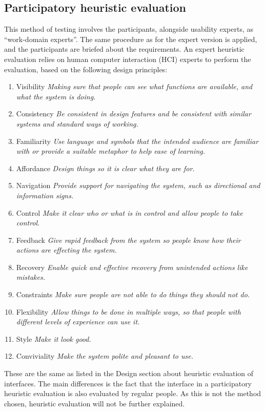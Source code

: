 \subsection{Participatory heuristic evaluation}
This method of testing involves the participants, alongside usability experts, as ``work-domain experts''. The same procedure as for the expert version is applied, and the participants are briefed about the requirements. An expert heuristic evaluation relies on human computer interaction (HCI) experts to perform the evaluation, based on the following design principles:
\begin{enumerate}
	\item Visibility \textit{Making sure that people can see what functions are available, and what the system is doing.}
	\item Consistency \textit{Be consistent in design features and be consistent with similar systems and standard ways of working.}
	\item Familiarity \textit{Use language and symbols that the intended audience are familiar with or provide a suitable metaphor to help ease of learning.}
	\item Affordance \textit{Design things so it is clear what they are for.}
	\item Navigation \textit{Provide support for navigating the system, such as directional and information signs.}
	\item Control \textit{Make it clear who or what is in control and allow people to take control.}
	\item Feedback \textit{Give rapid feedback from the system so people know how their actions are effecting the system.}
	\item Recovery \textit{Enable quick and effective recovery from unintended actions like mistakes.}
	\item Constraints \textit{Make sure people are not able to do things they should not do.}
	\item Flexibility \textit{Allow things to be done in multiple ways, so that people with different levels of experience can use it.}
	\item Style \textit{Make it look good.}
	\item Conviviality \textit{Make the system polite and pleasant to use.}
\end{enumerate}
These are the same as listed in the Design section about heuristic evaluation of interfaces. The main differences is the fact that the interface in a participatory heuristic evaluation is also evaluated by regular people. As this is not the method
chosen, heuristic evaluation will not be further explained.